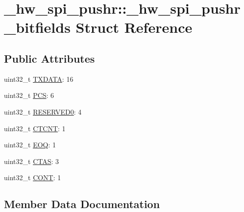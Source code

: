 \hypertarget{struct__hw__spi__pushr_1_1__hw__spi__pushr__bitfields}{}\section{\+\_\+hw\+\_\+spi\+\_\+pushr\+:\+:\+\_\+hw\+\_\+spi\+\_\+pushr\+\_\+bitfields Struct Reference}
\label{struct__hw__spi__pushr_1_1__hw__spi__pushr__bitfields}
\subsection*{Public Attributes}
\begin{DoxyCompactItemize}
\item 
uint32\+\_\+t \hyperlink{struct__hw__spi__pushr_1_1__hw__spi__pushr__bitfields_a4db75f8abed699acc6be847408abfe5e}{T\+X\+D\+A\+TA}\+: 16
\item 
uint32\+\_\+t \hyperlink{struct__hw__spi__pushr_1_1__hw__spi__pushr__bitfields_af06d873d19585c56cfe01ddb7019a15a}{P\+CS}\+: 6
\item 
uint32\+\_\+t \hyperlink{struct__hw__spi__pushr_1_1__hw__spi__pushr__bitfields_a6a39ac20be95b78c728245f6e44fcccb}{R\+E\+S\+E\+R\+V\+E\+D0}\+: 4
\item 
uint32\+\_\+t \hyperlink{struct__hw__spi__pushr_1_1__hw__spi__pushr__bitfields_a49a31218b6daa0b8a6692c777ab481f9}{C\+T\+C\+NT}\+: 1
\item 
uint32\+\_\+t \hyperlink{struct__hw__spi__pushr_1_1__hw__spi__pushr__bitfields_a33dbd72abcec2dc46d84f726cd8f126c}{E\+OQ}\+: 1
\item 
uint32\+\_\+t \hyperlink{struct__hw__spi__pushr_1_1__hw__spi__pushr__bitfields_a10c0608b221152dbda30c4ff7db2d338}{C\+T\+AS}\+: 3
\item 
uint32\+\_\+t \hyperlink{struct__hw__spi__pushr_1_1__hw__spi__pushr__bitfields_a5853cb0c5d7b495cd47f67c133ac80bf}{C\+O\+NT}\+: 1
\end{DoxyCompactItemize}


\subsection{Member Data Documentation}
